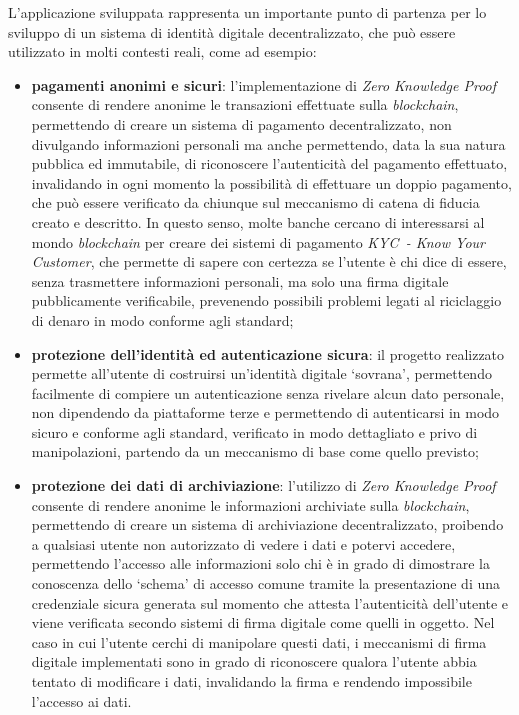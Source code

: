 L'applicazione sviluppata rappresenta un importante punto di partenza per lo sviluppo di un sistema di identità digitale decentralizzato, che può essere utilizzato in molti contesti reali, come ad esempio:
\begin{itemize}
    \item \textbf{pagamenti anonimi e sicuri}: l'implementazione di \textit{Zero Knowledge Proof} consente di rendere anonime le transazioni effettuate sulla \textit{blockchain}, permettendo di creare un sistema di pagamento decentralizzato, non divulgando informazioni personali ma anche 
    permettendo, data la sua natura pubblica ed immutabile, di riconoscere l'autenticità del pagamento effettuato, invalidando in ogni momento la possibilità di effettuare un doppio pagamento, che può essere verificato da chiunque sul meccanismo di catena di fiducia creato e descritto.
    In questo senso, molte banche cercano di interessarsi al mondo \textit{blockchain} per creare dei sistemi di pagamento \textit{KYC~- Know Your Customer}, che permette di sapere con certezza se l'utente è chi dice di essere, senza trasmettere informazioni personali, ma solo una firma digitale
    pubblicamente verificabile, prevenendo possibili problemi legati al riciclaggio di denaro in modo conforme agli standard;
    \item \textbf{protezione dell'identità ed autenticazione sicura}: il progetto realizzato permette all'utente di costruirsi un'identità digitale `sovrana', permettendo facilmente di compiere un autenticazione senza rivelare alcun dato personale, non dipendendo da piattaforme terze 
    e permettendo di autenticarsi in modo sicuro e conforme agli standard, verificato in modo dettagliato e privo di manipolazioni, partendo da un meccanismo di base come quello previsto;
    \item \textbf{protezione dei dati di archiviazione}: l'utilizzo di \textit{Zero Knowledge Proof} consente di rendere anonime le informazioni archiviate sulla \textit{blockchain}, permettendo di creare un sistema di archiviazione decentralizzato, proibendo a qualsiasi utente 
    non autorizzato di vedere i dati e potervi accedere, permettendo l'accesso alle informazioni solo chi è in grado di dimostrare la conoscenza dello `schema' di accesso comune tramite la presentazione di una credenziale sicura generata sul momento che attesta l'autenticità dell'utente
    e viene verificata secondo sistemi di firma digitale come quelli in oggetto. Nel caso in cui l'utente cerchi di manipolare questi dati, i meccanismi di firma digitale implementati sono in grado di riconoscere qualora 
    l'utente abbia tentato di modificare i dati, invalidando la firma e rendendo impossibile l'accesso ai dati.
\end{itemize}

